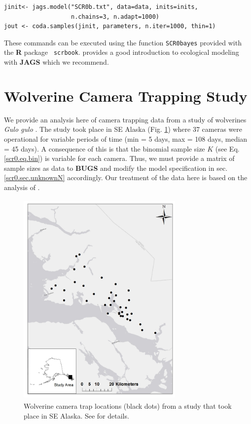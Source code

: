 {\small 
\begin{verbatim}
jinit<- jags.model("SCR0b.txt", data=data, inits=inits,  
                   n.chains=3, n.adapt=1000)
jout <- coda.samples(jinit, parameters, n.iter=1000, thin=1)
\end{verbatim}
These commands can be executed 
using the function
\mbox{\tt SCR0bayes} provided with the {\bf R} package \mbox{\tt
  scrbook}. \citet{hobbs:2011} provides a good introduction to
ecological modeling with {\bf JAGS} which we recommend.



\section{Wolverine Camera Trapping Study}
\label{scr0.sec.wolverine}

We provide an analysis here of camera trapping data from a study of
wolverines \emph{Gulo gulo}
\citep{magoun_etal:2011, royle_etal:2011jwm}. The study took place in
SE Alaska (Fig. \ref{scr0.fig.wolverinelocs}) where 37 cameras were
operational for variable periods of time (min = 5 days, max = 108
days, median = 45 days).  A consequence of this is that the binomial
sample size $K$ (see Eq. \ref{scr0.eq.bin}) is variable for each
camera. Thus, we must provide a matrix of sample sizes as data to {\bf
  BUGS} and modify the model specification in
sec. \ref{scr0.sec.unknownN} accordingly. Our treatment of the data
here is based on the analysis of \citet{royle_etal:2011jwm}.

\begin{figure}[ht]
\begin{center}
\includegraphics[height=4.22in,width=3.2in]{Ch4-SCR0/figs/Wolverines_cameratrap}
\end{center}
\caption{
Wolverine camera trap locations (black dots) from a study that took
place in SE Alaska. See 
\citet{magoun_etal:2011} for details.
}
\label{scr0.fig.wolverinelocs}
\end{figure}


}
